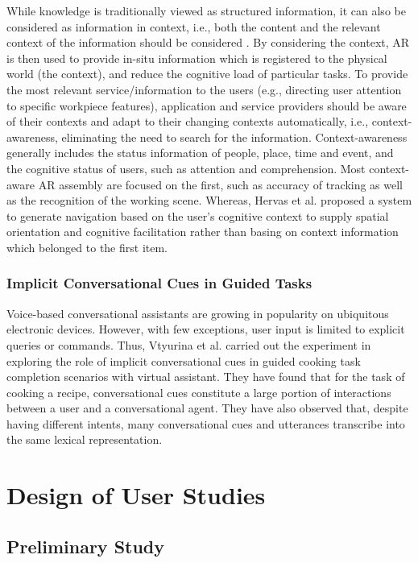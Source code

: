 \documentclass[fyp]{socreport}
\begin{document}
While knowledge is traditionally viewed as structured information, it can also be considered as information in context, i.e., both the content and the relevant context of the information should be considered \cite{chandrasegaran2013evolution}. By considering the context, AR is then used to provide in-situ information which is registered to the physical world (the context), and reduce the cognitive load of particular tasks. To provide the most relevant service/information to the users (e.g., directing user attention to specific workpiece features), application and service providers should be aware of their contexts and adapt to their changing contexts automatically, i.e., context-awareness, eliminating the need to search for the information. Context-awareness generally includes the status information of people, place, time and event, and the cognitive status of users, such as attention and comprehension. Most context-aware AR assembly are focused on the first, such as accuracy of tracking as well as the recognition of the working scene. Whereas, Hervas et al. \cite{hervas2013assistive} proposed a system to generate navigation based on the user’s cognitive context to supply spatial orientation and cognitive facilitation rather than basing on context information which belonged to the first item.

\subsection{Implicit Conversational Cues in Guided Tasks}
Voice-based conversational assistants are growing in popularity on ubiquitous electronic devices. However, with few exceptions, user input is limited to explicit queries or commands. Thus, Vtyurina et al. carried out the experiment \cite{vtyurina2018exploring} in exploring the role of implicit conversational cues in guided cooking task completion scenarios with virtual assistant. They have found that for the task of cooking a recipe, conversational cues constitute a large portion of interactions between a user and a conversational agent. They have also observed that, despite having different intents, many conversational cues and utterances transcribe into the same lexical representation. 

\chapter{Design of User Studies}
\section{Preliminary Study}
\end{document}
